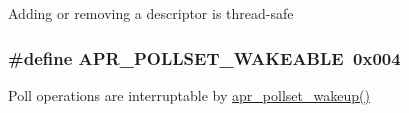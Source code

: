 Adding or removing a descriptor is thread-\/safe \hypertarget{group__pollflags_ga552d7f28d442602e6c9bb6931f183493}{
\subsubsection[{A\-P\-R\-\_\-\-P\-O\-L\-L\-S\-E\-T\-\_\-\-W\-A\-K\-E\-A\-B\-L\-E}]{\setlength{\rightskip}{0pt plus 5cm}\#define A\-P\-R\-\_\-\-P\-O\-L\-L\-S\-E\-T\-\_\-\-W\-A\-K\-E\-A\-B\-L\-E~0x004}}\label{group__pollflags_ga552d7f28d442602e6c9bb6931f183493}
Poll operations are interruptable by \hyperlink{group__apr__poll_gac5e86828143e169e18b2a6eab94be531}{apr\-\_\-pollset\-\_\-wakeup()} 